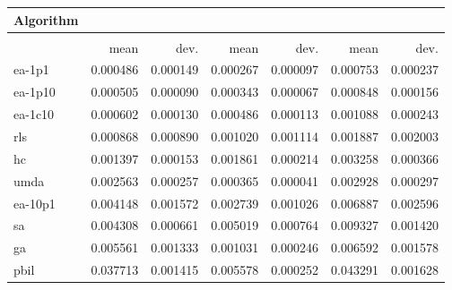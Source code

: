 \begin{tabular}{@{} l *{6}{>{{}}N{1}{2}} @{}}
\toprule
{Algorithm} &  \\
\midrule
&  &  &  \\
\midrule
& {mean} & {dev.} & {mean} & {dev.} & {mean} & {dev.} \\
\midrule
ea-1p1 & 0.000486 & 0.000149 & 0.000267 & 0.000097 & 0.000753 & 0.000237 \\
ea-1p10 & 0.000505 & 0.000090 & 0.000343 & 0.000067 & 0.000848 & 0.000156 \\
ea-1c10 & 0.000602 & 0.000130 & 0.000486 & 0.000113 & 0.001088 & 0.000243 \\
rls & 0.000868 & 0.000890 & 0.001020 & 0.001114 & 0.001887 & 0.002003 \\
hc & 0.001397 & 0.000153 & 0.001861 & 0.000214 & 0.003258 & 0.000366 \\
umda & 0.002563 & 0.000257 & 0.000365 & 0.000041 & 0.002928 & 0.000297 \\
ea-10p1 & 0.004148 & 0.001572 & 0.002739 & 0.001026 & 0.006887 & 0.002596 \\
sa & 0.004308 & 0.000661 & 0.005019 & 0.000764 & 0.009327 & 0.001420 \\
ga & 0.005561 & 0.001333 & 0.001031 & 0.000246 & 0.006592 & 0.001578 \\
pbil & 0.037713 & 0.001415 & 0.005578 & 0.000252 & 0.043291 & 0.001628 \\
\bottomrule
\end{tabular}
